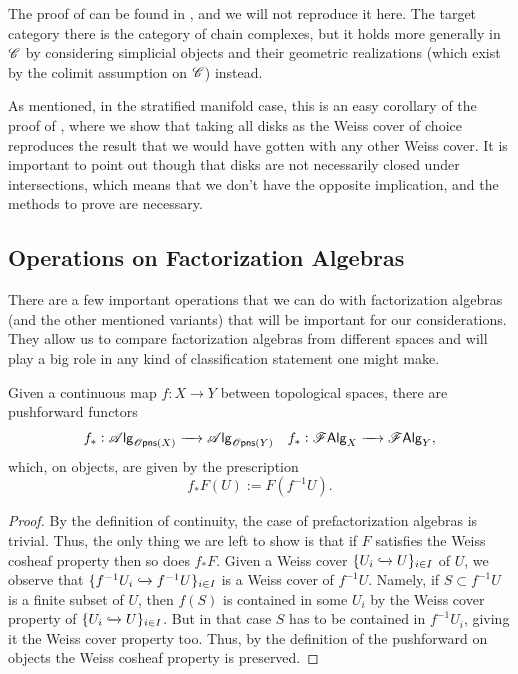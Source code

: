 \documentclass[../text]{subfiles}
\begin{document}
\begin{remark}
    The proof of  can be found in \cite[ch.7.2]{cg2016}, and we will not reproduce it here. The target category there is the category of chain complexes, but it holds more generally in $\mathscr{C}$ by considering simplicial objects and their geometric realizations (which exist by the colimit assumption on $\mathscr{C}$) instead.
    
    As mentioned, in the stratified manifold case, this is an easy corollary of the proof of , where we show that taking all disks as the Weiss cover of choice reproduces the result that we would have gotten with any other Weiss cover. It is important to point out though that disks are not necessarily closed under intersections, which means that we don't have the opposite implication, and the methods to prove  are necessary.
\end{remark}


\subsection{Operations on Factorization Algebras}

There are a few important operations that we can do with factorization algebras (and the other mentioned variants) that will be important for our considerations. They allow us to compare factorization algebras from different spaces and will play a big role in any kind of classification statement one might make.


\begin{proposition}\label{prop:pushforward}
    Given a continuous map $f:X \rightarrow Y$ between topological spaces, there are pushforward functors
    \begin{align}
        &f_*: \alg{\opens[s](X)} \xrightarrow{\quad} \alg{\opens[s](Y)} &f_*: \falg_X \xrightarrow{\quad} \falg_Y,
    \end{align}
    which, on objects, are given by the prescription
    \begin{equation}
        f_*F (U) := F(f^{-1}U).
    \end{equation}
\end{proposition}

\begin{proof}
    By the definition of continuity, the case of prefactorization algebras is trivial. Thus, the only thing we are left to show is that if $F$ satisfies the Weiss cosheaf property then so does $f_* F$. Given a Weiss cover $\{U_i \xhookrightarrow{} U\}_{i \in I}$ of $U$, we observe that $\{f^{-1}U_i \xhookrightarrow{} f^{-1}U\}_{i \in I}$ is a Weiss cover of $f^{-1}U$. Namely, if $S \subset f^{-1}U$ is a finite subset of $U$, then $f(S)$ is contained in some $U_i$ by the Weiss cover property of $\{U_i \xhookrightarrow{} U\}_{i \in I}$. But in that case $S$ has to be contained in $f^{-1}U_i$, giving it the Weiss cover property too. Thus, by the definition of the pushforward on objects the Weiss cosheaf property is preserved.
\end{proof}
\end{document}
